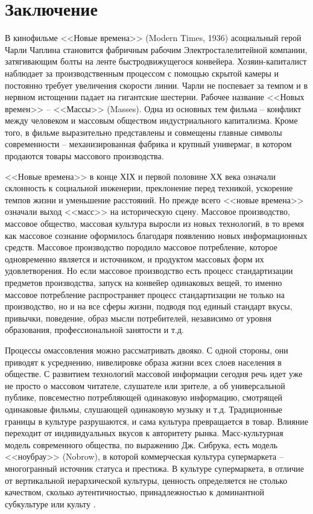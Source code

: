 \section*{Заключение}

В кинофильме <<Новые времена>> (Modern Times, 1936) асоциальный герой Чарли Чаплина становится
фабричным рабочим Электросталелитейной компании, затягивающим болты на ленте быстродвижущегося
конвейера. Хозяин-капиталист наблюдает за производственным процессом с помощью скрытой камеры и
постоянно требует увеличения скорости линии. Чарли не поспевает за темпом и в нервном истощении
падает на гигантские шестерни. Рабочее название <<Новых времен>> -- <<Массы>> (Masses).  Одна из
основных тем фильма -- конфликт между человеком и массовым обществом индустриального
капитализма. Кроме того, в фильме выразительно представлены и совмещены главные символы
современности -- механизированная фабрика и крупный универмаг, в котором продаются товары массового
производства.

<<Новые времена>> в конце ХIХ и первой половине ХХ века означали склонность к социальной инженерии,
преклонение перед техникой,  ускорение темпов жизни и уменьшение расстояний.  Но прежде всего <<новые
времена>> означали выход <<масс>> на историческую сцену. Массовое производство, массовое общество,
массовая культура выросли из новых технологий, в то время как массовое сознание оформилось благодаря
появлению новых информационных средств. Массовое производство породило массовое потребление, которое
одновременно является и источником, и продуктом массовых форм их удовлетворения.  Но если массовое
производство есть процесс стандартизации предметов производства, запуск на конвейер одинаковых
вещей, то именно массовое потребление распространяет процесс стандартизации не только на
производство, но и на все сферы жизни, подводя под единый стандарт вкусы, привычки, поведение, образ
мысли потребителей, независимо от уровня образования, профессиональной занятости и т.д.

Процессы омассовления можно рассматривать двояко. С одной стороны, они приводят к усреднению,
нивелировке образа жизни всех слоев населения в обществе. С развитием технологий массовой информации
сегодня речь идет уже не просто о массовом читателе, слушателе или зрителе, а об универсальной
публике, повсеместно потребляющей одинаковую информацию, смотрящей одинаковые фильмы, слушающей
одинаковую  музыку и т.д. Традиционные границы в культуре  разрушаются, и сама культура превращается
в товар. Влияние переходит от индивидуальных вкусов к авторитету рынка. Масс-культурная модель
современного общества, по выражению Дж. Сибрука, есть модель <<ноубрау>> (Nobrow), в которой
коммерческая культура супермаркета -- многогранный источник статуса и престижа. В культуре
супермаркета, в отличие от вертикальной иерархической культуры, ценность определяется не столько
качеством, сколько аутентичностью, принадлежностью к доминантной субкультуре или культу \autocite[][74]{sibruk2005}.

